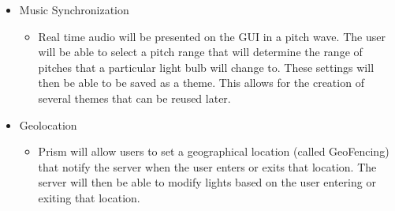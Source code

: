 \documentclass[12pt]{article}
\begin{document}
\begin{itemize}
\item Music Synchronization
\begin{itemize}
\item Real time audio will be presented on the GUI in a pitch wave.  The user will be able to select a pitch range that will determine the range of pitches that a particular light bulb will change to. These settings will then be able to be saved as a theme.  This allows for the creation of several themes that can be reused later.
\end{itemize}


\item Geolocation
\begin{itemize}
\item Prism will allow users to set a geographical location (called GeoFencing) that notify the server when the user enters or exits that location.  The server will then be able to modify lights based on the user entering or exiting that location. 
\end{itemize}
\end{itemize}
\end{document}
